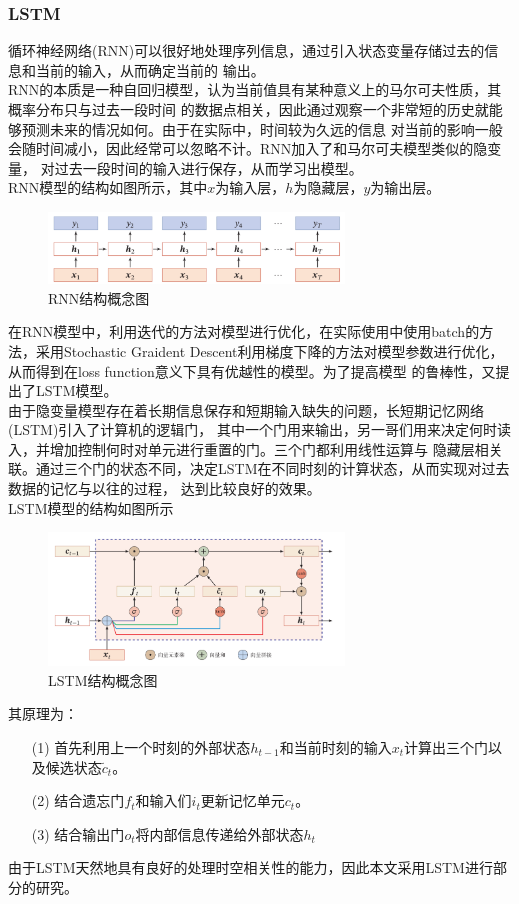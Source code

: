 \documentclass{ctexart}
\begin{document}
\subsubsection{LSTM}
循环神经网络(RNN)可以很好地处理序列信息，通过引入状态变量存储过去的信息和当前的输入，从而确定当前的
输出。\\
\indent RNN的本质是一种自回归模型，认为当前值具有某种意义上的马尔可夫性质，其概率分布只与过去一段时间
的数据点相关，因此通过观察一个非常短的历史就能够预测未来的情况如何。由于在实际中，时间较为久远的信息
对当前的影响一般会随时间减小，因此经常可以忽略不计。RNN加入了和马尔可夫模型类似的隐变量，
对过去一段时间的输入进行保存，从而学习出模型。\\
\indent RNN模型的结构如图所示，其中$x$为输入层，$h$为隐藏层，$y$为输出层。\\
\begin{figure}[htbp]
    \centering
    \includegraphics[width=0.70\textwidth]{photos/RNN.png}
    \caption{RNN结构概念图}
\end{figure}
\indent 在RNN模型中，利用迭代的方法对模型进行优化，在实际使用中使用batch的方法，采用Stochastic Graident 
Descent利用梯度下降的方法对模型参数进行优化，从而得到在loss function意义下具有优越性的模型。为了提高模型
的鲁棒性，又提出了LSTM模型。\\
\indent 由于隐变量模型存在着长期信息保存和短期输入缺失的问题，长短期记忆网络(LSTM)引入了计算机的逻辑门，
其中一个门用来输出，另一哥们用来决定何时读入，并增加控制何时对单元进行重置的门。三个门都利用线性运算与
隐藏层相关联。通过三个门的状态不同，决定LSTM在不同时刻的计算状态，从而实现对过去数据的记忆与以往的过程，
达到比较良好的效果。\\
\indent LSTM模型的结构如图所示\\
\begin{figure}
    \centering
    \includegraphics[width=0.70\textwidth]{photos/LSTM.png}
    \caption{LSTM结构概念图}
\end{figure}
其原理为：
\begin{enumerate}
    \item [(1)] 首先利用上一个时刻的外部状态$h_{t-1}$和当前时刻的输入$x_t$计算出三个门以及候选状态$\tilde{c}_t$。
    \item [(2)] 结合遗忘门$f_t$和输入们$i_t$更新记忆单元$c_t$。
    \item [(3)] 结合输出门$o_t$将内部信息传递给外部状态$h_t$
\end{enumerate}
\indent 由于LSTM天然地具有良好的处理时空相关性的能力，因此本文采用LSTM进行部分的研究。
\end{document}
